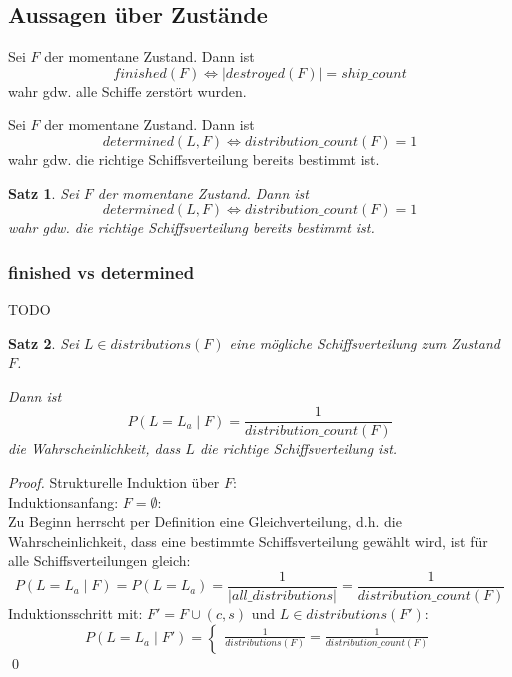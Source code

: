 \documentclass[a4paper,12pt]{llncs}
\numberwithin{equation}{section}
\newtheorem{satz}{Satz}
\begin{document}
\subsection{Aussagen über Zustände}

\begin{definition}
Sei $F$ der momentane Zustand.
Dann ist
\[
finished(F) \Leftrightarrow |destroyed(F)|=ship\_count
\]
wahr gdw. alle Schiffe zerstört wurden.
\end{definition}

\begin{definition}
Sei $F$ der momentane Zustand.
Dann ist
\[
determined(L, F) \Leftrightarrow distribution\_count(F)=1
\]
wahr gdw. die richtige Schiffsverteilung bereits bestimmt ist.
\end{definition}

\begin{satz}
Sei $F$ der momentane Zustand.
Dann ist
\[
determined(L, F) \Leftrightarrow distribution\_count(F)=1
\]
wahr gdw. die richtige Schiffsverteilung bereits bestimmt ist.
\end{satz}

\subsubsection{finished vs determined}
TODO

\begin{satz}
Sei $L \in distributions(F)$ eine mögliche Schiffsverteilung zum Zustand $F$.

Dann ist
\[
P(L = L_a \mid F)=\frac{1}{distribution\_count(F)}
\]
die Wahrscheinlichkeit, dass $L$ die richtige Schiffsverteilung ist.
\end{satz}

\begin{proof}
Strukturelle Induktion über $F$:\\
Induktionsanfang: $F=\emptyset$:\\
Zu Beginn herrscht per Definition eine Gleichverteilung, d.h. die Wahrscheinlichkeit, dass eine bestimmte Schiffsverteilung gewählt wird, ist für alle Schiffsverteilungen gleich:
\[
P(L = L_a \mid F)=P(L = L_a)=\frac{1}{|all\_distributions|}=\frac{1}{distribution\_count(F)}
\]
Induktionsschritt mit: $F'=F \cup (c,s)$ und $L \in distributions(F')$:\\
\[
P(L = L_a \mid F')=
\begin{cases}
\frac{1}{distributions(F)}=\frac{1}{distribution\_count(F)}
\end{cases}
\]
\qed
\end{proof}
\end{document}
